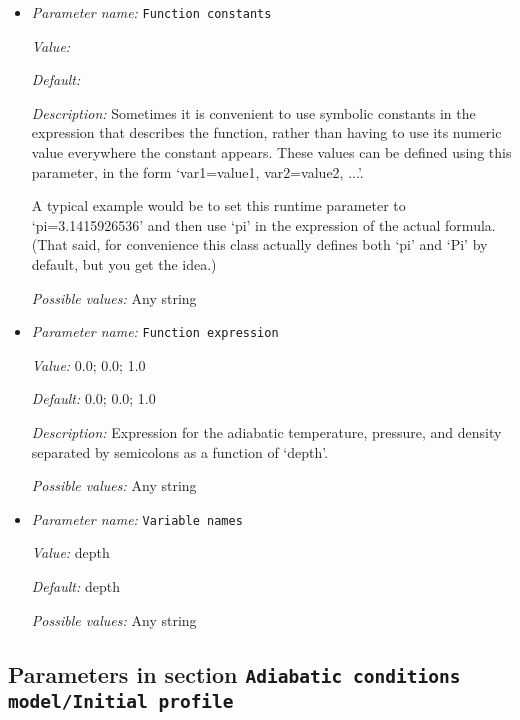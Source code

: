\begin{itemize}
\item {\it Parameter name:} {\tt Function constants}
\label{parameters:Adiabatic conditions model/Function/Function constants}


{\it Value:} 


{\it Default:} 


{\it Description:} Sometimes it is convenient to use symbolic constants in the expression that describes the function, rather than having to use its numeric value everywhere the constant appears. These values can be defined using this parameter, in the form `var1=value1, var2=value2, ...'.

A typical example would be to set this runtime parameter to `pi=3.1415926536' and then use `pi' in the expression of the actual formula. (That said, for convenience this class actually defines both `pi' and `Pi' by default, but you get the idea.)


{\it Possible values:} Any string
\item {\it Parameter name:} {\tt Function expression}
\label{parameters:Adiabatic conditions model/Function/Function expression}


{\it Value:} 0.0; 0.0; 1.0


{\it Default:} 0.0; 0.0; 1.0


{\it Description:} Expression for the adiabatic temperature, pressure, and density separated by semicolons as a function of `depth'.


{\it Possible values:} Any string
\item {\it Parameter name:} {\tt Variable names}
\label{parameters:Adiabatic conditions model/Function/Variable names}


{\it Value:} depth


{\it Default:} depth


{\it Possible values:} Any string
\end{itemize}

\subsection{Parameters in section \tt Adiabatic conditions model/Initial profile}
\label{parameters:Adiabatic_20conditions_20model/Initial_20profile}

